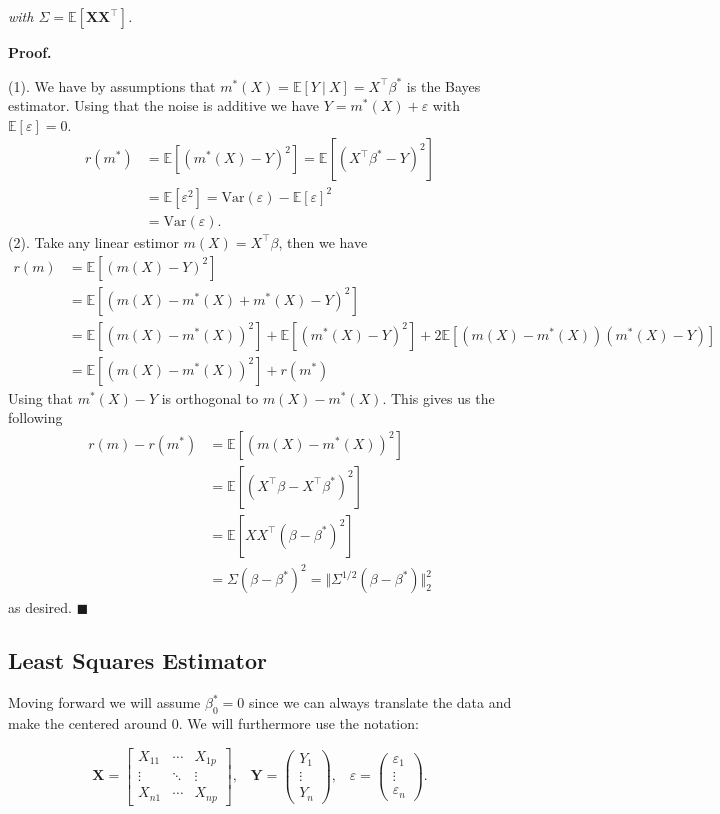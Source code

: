 \documentclass[a4paper,12pt,openany]{book}
\begin{document}
\emph{with \(\Sigma = \mathbb E[\mathbf X\mathbf X^\top]\).}

\textbf{Proof.}

(1). We have by assumptions that \(m^*(X)=\mathbb E[Y\ \vert\ X]=X^\top\beta^*\) is the Bayes estimator. Using that the noise is additive we have \(Y=m^*(X)+\varepsilon\) with \(\mathbb E[\varepsilon]=0\).
\begin{align*}
r(m^*)&=\mathbb E[(m^*(X)-Y)^2]=\mathbb E[(X^\top\beta ^*-Y)^2]\\
&=\mathbb E[\varepsilon^2]=\text{Var}(\varepsilon)-\mathbb E[\varepsilon]^2\\
&=\text{Var}(\varepsilon).
\end{align*}
(2). Take any linear estimor \(m(X)=X^\top \beta\), then we have
\begin{align*}
r(m)&=\mathbb E[(m(X)-Y)^2]\\
&=\mathbb E[(m(X)-m^*(X)+m^*(X)-Y)^2]\\
&=\mathbb E[(m(X)-m^*(X))^2]+\mathbb E[(m^*(X)-Y)^2]+2\mathbb E[(m(X)-m^*(X))(m^*(X)-Y)]\\
&=\mathbb E[(m(X)-m^*(X))^2]+r(m^*)
\end{align*}
Using that \(m^*(X)-Y\) is orthogonal to \(m(X)-m^*(X)\). This gives us the following
\begin{align*}
r(m)- r(m^*)&=\mathbb E[(m(X)-m^*(X))^2]\\
&=\mathbb E[(X^\top \beta -X^\top \beta^*)^2]\\
&=\mathbb E[XX^\top(\beta-\beta^*)^2]\\
&=\Sigma(\beta-\beta^*)^2=\Vert \Sigma^{1/2}(\beta - \beta^*)\Vert ^2_2
\end{align*}
as desired. \(\blacksquare\)

\hypertarget{least-squares-estimator}{%
\subsection{Least Squares Estimator}\label{least-squares-estimator}}

Moving forward we will assume \(\beta_0^*=0\) since we can always translate the data and make the centered around 0. We will furthermore use the notation:

\[
\mathbf{X}=
\begin{bmatrix}
X_{11} & \cdots & X_{1p}\\
\vdots & \ddots & \vdots\\
X_{n1} & \cdots & X_{np}
\end{bmatrix},\hspace{10pt} \mathbf{Y}=
\begin{pmatrix}
Y_1\\
\vdots\\
Y_n
\end{pmatrix},\hspace{10pt} \varepsilon=
\begin{pmatrix}
\varepsilon_1\\
\vdots\\
\varepsilon_n
\end{pmatrix}.
\]
\end{document}
